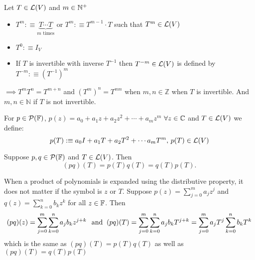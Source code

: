 \setcounter{thm}{12}
\begin{mydef}
  Let $T \in \mathcal{L}(V)$ and $m\in \mathbb{N}^{+}$
  \begin{itemize}
    \item $T^{m} :\equiv \underbrace{T \cdots T}_{\text{$m$ times}}$ or $T^{m} :\equiv T^{m-1} \cdot T$ such that $T^{m} \in \mathcal{L}(V)$
    \item $T^0 :\equiv I_V$
    \item If $T$ is invertible with inverse $T^{-1}$ then $T^{-m}\in \mathcal{L}(V)$ is defined by $T^{-m} :\equiv (T^{-1})^m$
  \end{itemize}
\end{mydef}
$\implies T^m T^n = T^{m+n}$ and $(T^m)^n=T^{mn}$ when $m,n \in \mathbb{Z}$ when $T$ is invertible. And $m,n \in \mathbb{N}$ if $T$ is not invertible.

\begin{mydef}
  For $p \in \mathcal{P} (\mathbb{F})$, $p(z) = a_0+a_1z+a_2z^2+\cdots+a_mz^m$
  $\forall z \in \mathbb{C}$ and
  $T \in \mathcal{L} (V)$ we define: 
  \begin{equation}
    p(T) :\equiv a_0 I + a_1 T + a_2 T^2 + \cdots a_m T^m,$ $p(T) \in \linmap(V)
  \end{equation}
\end{mydef}



\setcounter{thm}{16}
\begin{thm} 
  \label{multiplicative-properties}
  Suppose $p,q \in \mathcal{P} (\mathbb{F})$ and $T\in \mathcal{L} (V)$. Then \begin{equation}
    (p q)(T) = p(T) q(T) = q(T)p(T).
  \end{equation}
\end{thm}
\begin{prf} When a product of polynomials is expanded using the distributive property, it does not matter if the symbol is $z$ or $T$. Suppose $p(z) = \sum_{j=0}^{m} a_j z^j$ and $q(z)=\sum_{k=0}^{n} b_k z^k$ for all $z \in \mathbb{F}$. Then  %
  \begin{equation}
    (pq)(z) = \sum_{j=0}^{m} \sum_{k=0}^{n} a_j b_k z^{j+k} \;\;\, \text{and}\;\;
    (pq)(T) = \sum_{j=0}^{m} \sum_{k=0}^{n} a_j b_k T^{j+k}
            = \sum_{j=0}^{m} a_j T^j \sum_{k=0}^{n}  b_k T^k
  \end{equation}
  which is the same as $(pq)(T) = p(T)q(T)$ as well as $(pq)(T) = q(T)p(T)$
  
\end{prf}


